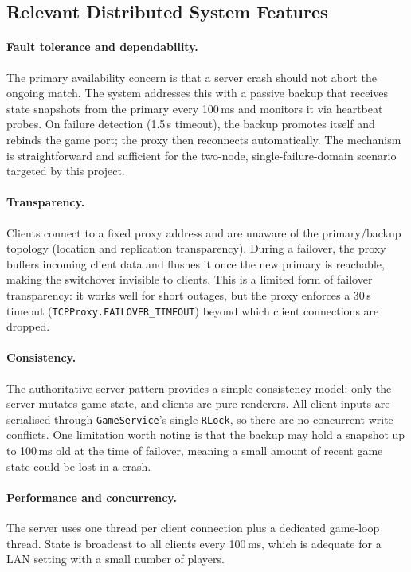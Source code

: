 \documentclass{scrartcl}
\begin{document}
\subsection{Relevant Distributed System Features}\label{ds-features}

\paragraph{Fault tolerance and dependability.}
The primary availability concern is that a server crash should not abort the ongoing match.
The system addresses this with a passive backup that receives state snapshots from the primary every 100\,ms and monitors it via heartbeat probes.
On failure detection (1.5\,s timeout), the backup promotes itself and rebinds the game port; the proxy then reconnects automatically.
The mechanism is straightforward and sufficient for the two-node, single-failure-domain scenario targeted by this project.

\paragraph{Transparency.}
Clients connect to a fixed proxy address and are unaware of the primary/backup topology (location and replication transparency).
During a failover, the proxy buffers incoming client data and flushes it once the new primary is reachable, making the switchover invisible to clients.
This is a limited form of failover transparency: it works well for short outages, but the proxy enforces a 30\,s timeout (\texttt{TCPProxy.FAILOVER\_TIMEOUT}) beyond which client connections are dropped.

\paragraph{Consistency.}
The authoritative server pattern provides a simple consistency model: only the server mutates game state, and clients are pure renderers.
All client inputs are serialised through \texttt{GameService}'s single \texttt{RLock}, so there are no concurrent write conflicts.
One limitation worth noting is that the backup may hold a snapshot up to 100\,ms old at the time of failover, meaning a small amount of recent game state could be lost in a crash.

\paragraph{Performance and concurrency.}
The server uses one thread per client connection plus a dedicated game-loop thread.
State is broadcast to all clients every 100\,ms, which is adequate for a LAN setting with a small number of players.
\end{document}
